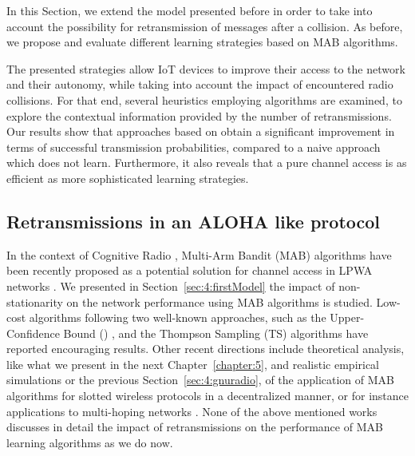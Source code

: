 
\graphicspath{{2-Chapters/4-Chapter/IEEE_WCNC__2019__Paper__BMBM.git/}}

In this Section, we extend the model presented before in order to take into account the possibility for retransmission of messages after a collision.
As before, we propose and evaluate different learning strategies based on MAB algorithms.

The presented strategies allow IoT devices to improve their access to the network and their autonomy, while taking into account the impact of encountered radio collisions.
For that end, several heuristics employing \UCB{} algorithms are examined, to explore the contextual information provided by the number of retransmissions.
Our results show that approaches based on \UCB{} obtain a significant improvement in terms of successful transmission probabilities, compared to a naive approach which does not learn.
Furthermore, it also reveals that a pure \UCB{} channel access is as efficient as more sophisticated learning strategies.




\subsection{Retransmissions in an ALOHA like protocol}
\label{sub:43:introduction}

In the context of Cognitive Radio \cite{Mitola99,Haykin05},
Multi-Arm Bandit (MAB) algorithms \cite{Auer02,Auer02,Bubeck12} have been recently proposed as a potential solution for channel access in LPWA networks \cite{Bonnefoi18,Azari18,Bonnefoi17}.
We presented in Section~\ref{sec:4:firstModel} the impact of non-stationarity on the network performance using MAB algorithms is studied.
Low-cost algorithms following two well-known approaches, such as the Upper-Confidence Bound (\UCB{}) \cite{Auer02,Auer02}, and the Thompson Sampling (TS) algorithms \cite{Thompson33} have reported encouraging results.
Other recent directions include theoretical analysis, like what we present in the next Chapter~\ref{chapter:5},
and realistic empirical simulations \cite{kumar2016two,kumar2017channel} or the previous Section~\ref{sec:4:gnuradio},
of the application of MAB algorithms for slotted wireless protocols in a decentralized manner,
or for instance applications to multi-hoping networks \cite{Mitton16,Toldov16}.
None of the above mentioned works discusses in detail the impact of retransmissions on the performance of MAB learning algorithms as we do now.


